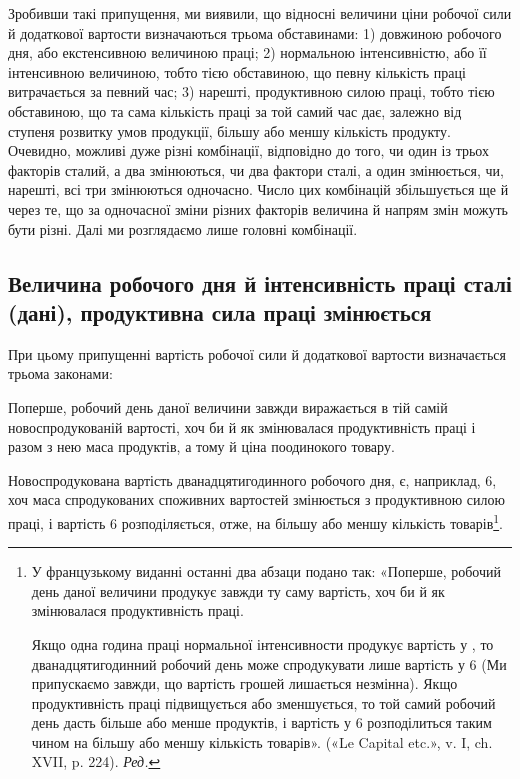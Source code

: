 Зробивши такі припущення, ми виявили, що відносні величини
ціни робочої сили й додаткової вартости визначаються
трьома обставинами: 1) довжиною робочого дня, або екстенсивною
величиною праці; 2) нормальною інтенсивністю, або її інтенсивною
величиною, тобто тією обставиною, що певну кількість
праці витрачається за певний час; 3) нарешті, продуктивною
силою праці, тобто тією обставиною, що та сама кількість праці
за той самий час дає, залежно від ступеня розвитку умов продукції,
більшу або меншу кількість продукту. Очевидно, можливі
дуже різні комбінації, відповідно до того, чи один із трьох факторів
сталий, а два змінюються, чи два фактори сталі, а один
змінюється, чи, нарешті, всі три змінюються одночасно. Число
цих комбінацій збільшується ще й через те, що за одночасної
зміни різних факторів величина й напрям змін можуть бути
різні. Далі ми розглядаємо лише головні комбінації.

\subsection{Величина робочого дня й інтенсивність праці сталі (дані),
продуктивна сила праці змінюється}

При цьому припущенні вартість робочої сили й додаткової
вартости визначається трьома законами:

Поперше, робочий день даної величини завжди виражається
в тій самій новоспродукованій вартості, хоч би й як змінювалася
продуктивність праці і разом з нею маса продуктів, а тому й
ціна поодинокого товару.

Новоспродукована вартість дванадцятигодинного робочого
дня, є, наприклад, 6, хоч маса спродукованих споживних
вартостей змінюється з продуктивною силою праці, і вартість
6 розподіляється, отже, на більшу або меншу кількість
товарів\footnote*{
У французькому виданні останні два абзаци подано так: «Поперше,
робочий день даної величини продукує завжди ту саму вартість,
хоч би й як змінювалася продуктивність праці.

Якщо одна година праці нормальної інтенсивности продукує вартість
у , то дванадцятигодинний робочий день може спродукувати
лише вартість у 6 (Ми припускаємо завжди, що вартість грошей
лишається незмінна). Якщо продуктивність праці підвищується або зменшується,
то той самий робочий день дасть більше або менше продуктів,
і вартість у 6 розподілиться таким чином на більшу або меншу
кількість товарів». («Le Capital etc.», v. I, ch. XVII, p. 224). \emph{Ред.}
}.

